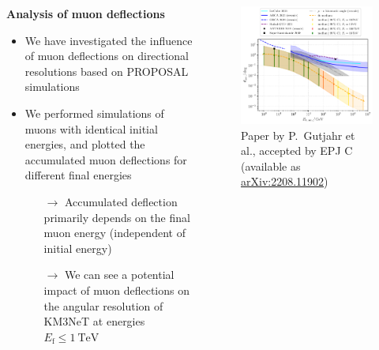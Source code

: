 \begin{frame}[c]
    \begin{columns}[onlytextwidth]
    \begin{column}{0.45\textwidth}
        \textbf{Analysis of muon deflections}
        \begin{itemize}
            \item We have investigated the influence of muon deflections on directional resolutions based on PROPOSAL simulations
            \item We performed simulations of muons with identical initial energies, and plotted the accumulated muon deflections for different final energies
            \begin{itemize}
                \item[$\rightarrow$] Accumulated deflection primarily depends on the final muon energy (independent of initial energy)
                \item[$\rightarrow$] We can see a potential impact of muon deflections on the angular resolution of KM3NeT at energies $E_\text{f} \leq \SI{1}{\tera\electronvolt}$
            \end{itemize} 
        \end{itemize}

    \end{column}
        \begin{column}{0.55\textwidth}
    		\begin{figure}
    		  \includegraphics[width=\linewidth, height=.85\textheight, keepaspectratio]{plots/fit_median_defl_cut_10percent_only_poly_new_resolution_rescale_no_icecube_paper_final_all.pdf}
    		  \captionsetup{justification=centering}
    		  \caption*{Paper by P.~Gutjahr et al., accepted by EPJ C \\(available as \href{https://arxiv.org/abs/2208.11902}{arXiv:2208.11902})}
    		\end{figure}

        \end{column}
    \end{columns}
\end{frame}
